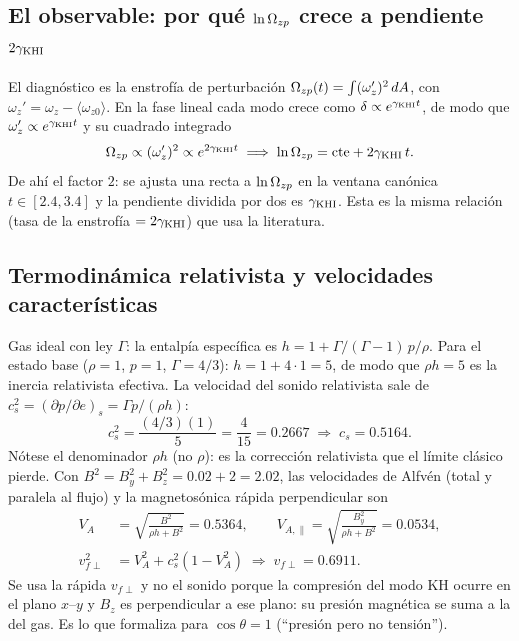 \subsection{El observable: por qué $\ln\Omega_{zp}$ crece a pendiente $2\gamma_{\mathrm{KHI}}$}

\primerparrafo El diagnóstico es la enstrofía de perturbación $\Omega_{zp}(t)=\int(\omega_z')^2\,dA$, con $\omega_z'=\omega_z-\langle\omega_{z0}\rangle$. En la fase lineal cada modo crece como $\delta\propto e^{\gamma_{\mathrm{KHI}} t}$, de modo que $\omega_z'\propto e^{\gamma_{\mathrm{KHI}} t}$ y su cuadrado integrado
\begin{equation}
\Omega_{zp}\propto(\omega_z')^2\propto e^{2\gamma_{\mathrm{KHI}} t}
\;\Longrightarrow\;
\ln\Omega_{zp}=\text{cte}+2\gamma_{\mathrm{KHI}}\,t.
\end{equation}
De ahí el factor $2$: se ajusta una recta a $\ln\Omega_{zp}$ en la ventana canónica $t\in[2.4,3.4]$ y la pendiente dividida por dos es $\gamma_{\mathrm{KHI}}$. Esta es la misma relación (tasa de la enstrofía $=2\gamma_{\mathrm{KHI}}$) que usa la literatura.

\subsection{Termodinámica relativista y velocidades características}
\label{ap:speeds}

\primerparrafo Gas ideal con ley $\Gamma$: la entalpía específica es $h=1+\Gamma/(\Gamma-1)\,p/\rho$. Para el estado base ($\rho=1$, $p=1$, $\Gamma=4/3$): $h=1+4\cdot1=5$, de modo que $\rho h=5$ es la inercia relativista efectiva. La velocidad del sonido relativista sale de $c_s^2=(\partial p/\partial e)_s=\Gamma p/(\rho h)$:
\begin{equation}
c_s^2=\frac{(4/3)(1)}{5}=\frac{4}{15}=0.2667\;\Rightarrow\;c_s=0.5164 .
\end{equation}
Nótese el denominador $\rho h$ (no $\rho$): es la corrección relativista que el límite clásico pierde. Con $B^2=B_y^2+B_z^2=0.02+2=2.02$, las velocidades de Alfvén (total y paralela al flujo) y la magnetosónica rápida perpendicular son
\begin{equation}
\begin{aligned}
V_A&=\sqrt{\frac{B^2}{\rho h+B^2}}=0.5364, \qquad
V_{A,\parallel}=\sqrt{\frac{B_y^2}{\rho h+B^2}}=0.0534,\\[2pt]
v_{f\perp}^2&=V_A^2+c_s^2(1-V_A^2)\;\Rightarrow\; v_{f\perp}=0.6911 .
\end{aligned}
\end{equation}
Se usa la rápida $v_{f\perp}$ y no el sonido porque la compresión del modo KH ocurre en el plano $x$--$y$ y $B_z$ es perpendicular a ese plano: su presión magnética se suma a la del gas. Es lo que \textcite{chow2023} formaliza para $\cos\theta=1$ (``presión pero no tensión'').

